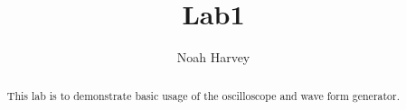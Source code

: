 \documentclass[a4paper,conference]{IEEEtran}
\begin{document}
\title{Lab1}
\author{Noah Harvey}
\maketitle

\begin{abstract}
This lab is to demonstrate basic usage of the oscilloscope and wave form
generator.	
\end{abstract}


\end{document}
